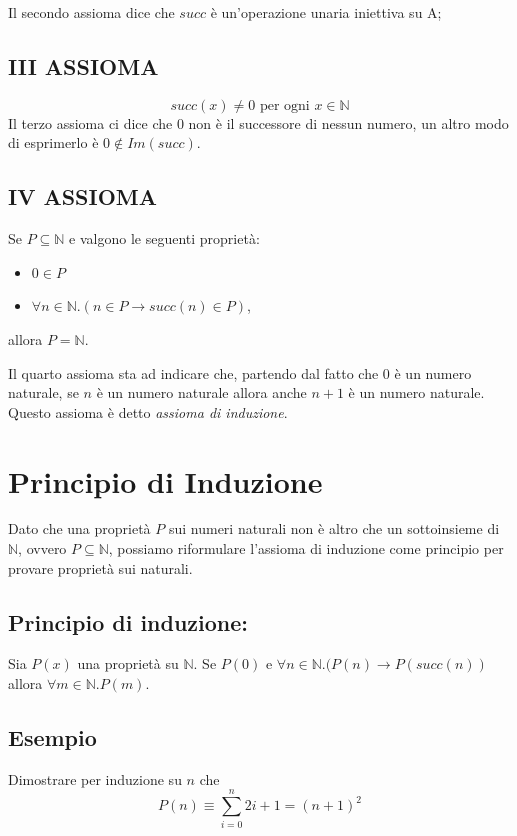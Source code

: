\documentclass[a4paper,12pt]{report}
\begin{document}
Il secondo assioma dice che $succ$ \`{e} un'operazione unaria iniettiva su A;

\subsection{III ASSIOMA}
\[ succ(x) \ne 0 \text{ per ogni } x \in \mathbb{N} \]
Il terzo assioma ci dice che 0 non \`{e} il successore di nessun numero, un altro modo di esprimerlo \`{e} $0 \notin Im(succ)$.

\subsection{IV ASSIOMA}
\begin{center} Se $P \subseteq \mathbb{N}$ e valgono le seguenti propriet\`{a}:
\begin{itemize}
\item $0 \in P$
\item $\forall n \in \mathbb{N}.(n \in P \rightarrow succ(n) \in P)$,
\end{itemize}
allora $P = \mathbb{N}$.
\end{center}
Il quarto assioma sta ad indicare che, partendo dal fatto che 0 \`{e} un numero naturale, se $n$ \`{e} un numero naturale allora anche $n+1$ \`{e} un numero naturale. Questo assioma \`{e} detto \emph{assioma di induzione}.

\section{Principio di Induzione}
Dato che una propriet\`{a} $P$ sui numeri naturali non \`{e} altro che un sottoinsieme di $\mathbb{N}$, ovvero $P\subseteq\mathbb{N}$, possiamo riformulare l'assioma di induzione come principio per provare propriet\`{a} sui naturali.
\subsection{Principio di induzione:}
Sia $P(x)$ una propriet\`{a} su $\mathbb{N}$. \newline
Se $P(0)$ e $\forall n \in \mathbb{N}.(P(n) \rightarrow P(succ(n))$ allora $\forall m \in \mathbb{N}.P(m)$.

\subsection{Esempio}
Dimostrare per induzione su $n$ che 
\[ P(n) \equiv \sum_{i=0}^{n}2i+1 = (n+1)^2 \]
\end{document}
